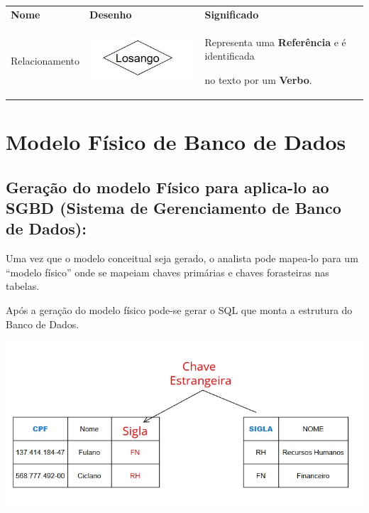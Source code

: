\documentclass[
]{book}
\begin{document}
\begin{longtable}[]{@{}
  >{\centering\arraybackslash}p{}
  >{\centering\arraybackslash}p{}
  >{\centering\arraybackslash}p{}@{}}
\toprule\noalign{}
\endhead
\bottomrule\noalign{}
\endlastfoot
\textbf{Nome} & \textbf{Desenho} & \textbf{Significado} \\
Relacionamento & \includegraphics[width=1.92708in,height=\textheight]{images/5-bi/04-losango.jpg} & Representa uma \textbf{Referência} e é identificada

no texto por um \textbf{Verbo}. \\
\end{longtable}

\section{Modelo Físico de Banco de Dados}\label{modelo-fuxedsico-de-banco-de-dados}

\subsection{Geração do modelo Físico para aplica-lo ao SGBD (Sistema de Gerenciamento de Banco de Dados):}\label{gerauxe7uxe3o-do-modelo-fuxedsico-para-aplica-lo-ao-sgbd-sistema-de-gerenciamento-de-banco-de-dados}

Uma vez que o modelo conceitual seja gerado, o analista pode mapea-lo para um ``modelo físico'' onde se mapeiam chaves primárias e chaves forasteiras nas tabelas.

Após a geração do modelo físico pode-se gerar o SQL que monta a estrutura do Banco de Dados.

\includegraphics{images/5-bi/06-modelo_fisico.jpg}
\end{document}
